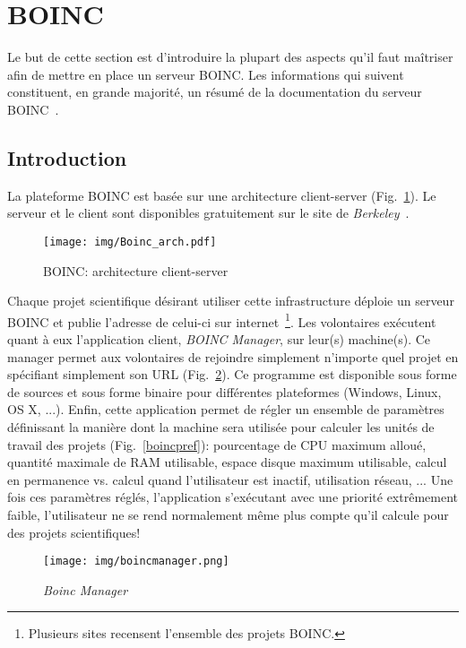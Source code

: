 \documentclass[a4paper, 11pt]{article}
\begin{document}
\section{\textsc{BOINC}}
Le but de cette section est d'introduire la plupart des aspects qu'il faut maîtriser afin de mettre en place un serveur \textsc{BOINC}. Les informations qui suivent constituent, en grande majorité, un résumé de la documentation du serveur \textsc{BOINC}~\cite{WIKI}.

\subsection{Introduction}
La plateforme \textsc{BOINC} est basée sur une architecture client-server (Fig.~\ref{clientserver}). Le serveur et le client sont disponibles gratuitement sur le site de \textit{Berkeley}~\cite{BOINC}.
\begin{figure}[!h]
\centering
\texttt{[image: img/Boinc\_arch.pdf]}
\caption{\textsc{BOINC}: architecture client-server}
\label{clientserver}
\end{figure}

Chaque projet scientifique désirant utiliser cette infrastructure déploie un serveur \textsc{BOINC} et publie l'adresse de celui-ci sur internet~\footnote{Plusieurs sites recensent l'ensemble des projets \textsc{BOINC}.}. %
Les volontaires exécutent quant à eux l'application client, \textit{BOINC Manager}, sur leur(s) machine(s). Ce manager permet aux volontaires de rejoindre simplement n'importe quel projet en spécifiant simplement son URL (Fig.~\ref{boincmanager}). Ce programme est disponible sous forme de sources et sous forme binaire pour différentes plateformes (Windows, Linux, OS X, ...). Enfin, cette application permet de régler un ensemble de paramètres définissant la manière dont la machine sera utilisée pour calculer les unités de travail des projets (Fig.~\ref{boincpref}): pourcentage de CPU maximum alloué, quantité maximale de RAM utilisable, espace disque maximum utilisable, calcul en permanence vs. calcul quand l'utilisateur est inactif, utilisation réseau, ... Une fois ces paramètres réglés, l'application s'exécutant avec une priorité extrêmement faible, l'utilisateur ne se rend normalement même plus compte qu'il calcule pour des projets scientifiques!

\begin{figure}[!h]
\centering
\texttt{[image: img/boincmanager.png]}
\caption{\textit{Boinc Manager}}
\label{boincmanager}
\end{figure}
\end{document}
